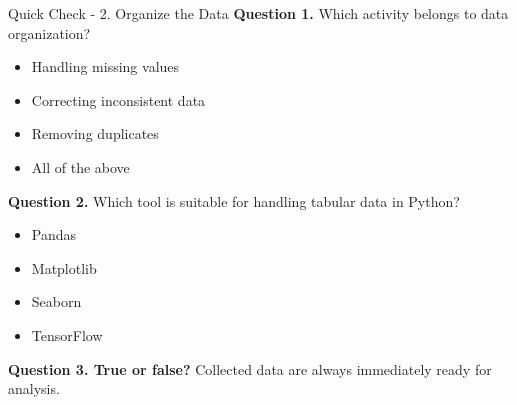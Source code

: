\documentclass[aspectratio=169,11pt]{beamer}
\begin{document}
\begin{frame}[allowframebreaks]{Quick Check - 2. Organize the Data}
\footnotesize
\textbf{Question 1.} Which activity belongs to data organization?\par\medskip
\begin{itemize}
\item[\textbf{A.}] Handling missing values
\item[\textbf{B.}] Correcting inconsistent data
\item[\textbf{C.}] Removing duplicates
\item[\textbf{D.}] All of the above
\end{itemize}
\textbf{Question 2.} Which tool is suitable for handling tabular data in Python?\par\medskip
\begin{itemize}
\item[\textbf{A.}] Pandas
\item[\textbf{B.}] Matplotlib
\item[\textbf{C.}] Seaborn
\item[\textbf{D.}] TensorFlow
\end{itemize}
\textbf{Question 3. True or false?} Collected data are always immediately ready for analysis.\par\medskip
\end{frame}
\end{document}
